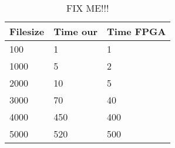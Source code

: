 \documentclass{article}
\begin{document}
\begin{table}
\centering
\begin{tabular}{lll}
 \hline
Filesize & Time our& Time FPGA\\ \hline 
100&1&1\\ 
1000&5&2\\ 
2000&10&5\\ 
3000&70&40\\ 
4000&450&400\\ 
5000&520&500\\ 
\hline
\end{tabular}
\caption{FIX ME!!!}
\label{tbl:oprv}
\end{table}
\end{document}
